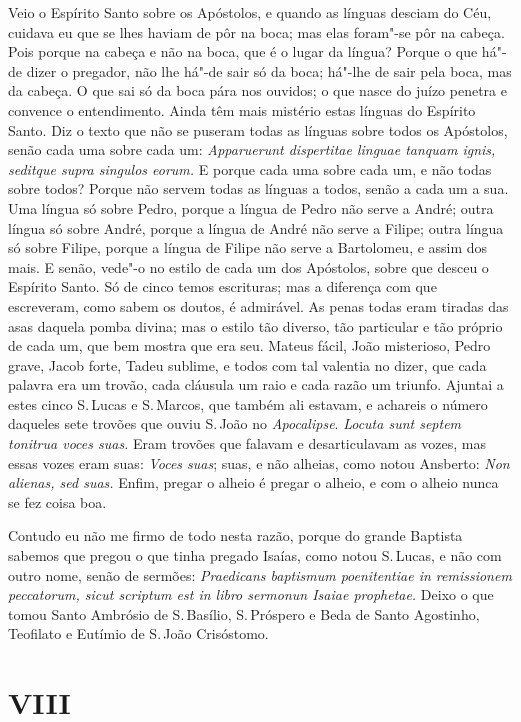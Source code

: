 Veio o Espírito Santo sobre os Apóstolos, e quando as línguas desciam do
Céu, cuidava eu que se lhes haviam de pôr na boca; mas elas foram"-se pôr
na cabeça. Pois porque na cabeça e não na boca, que é o lugar da língua?
Porque o que há"-de dizer o pregador, não lhe há"-de sair só da boca;
há"-lhe de sair pela boca, mas da cabeça. O que sai só da boca pára nos
ouvidos; o que nasce do juízo penetra e convence o entendimento. Ainda
têm mais mistério estas línguas do Espírito Santo. Diz o texto que não
se puseram
todas as línguas sobre todos os Apóstolos, senão cada uma sobre cada um:
\emph{Apparuerunt dispertitae linguae tanquam ignis, seditque supra
singulos eorum.} E porque cada uma sobre cada um, e
não todas sobre todos? Porque não servem todas as línguas a todos,
senão a cada um a sua. Uma língua só sobre Pedro, porque a língua de
Pedro não serve a André; outra língua só sobre André, porque a língua de
André não serve a Filipe; outra língua só sobre Filipe, porque a língua
de Filipe não serve a Bartolomeu, e assim dos mais. E senão, vede"-o no
estilo de cada um dos Apóstolos, sobre que desceu o Espírito Santo. Só
de cinco temos escrituras; mas a diferença com que escreveram, como
sabem os doutos, é admirável. As penas todas eram tiradas das asas
daquela pomba divina; mas o estilo tão diverso, tão particular e tão
próprio de cada um, que bem mostra que era seu. Mateus fácil, João
misterioso, Pedro grave, Jacob forte, Tadeu sublime, e todos com tal
valentia no dizer, que cada palavra era um trovão, cada cláusula um raio
e cada razão um triunfo. Ajuntai a estes cinco S.\,Lucas e S.\,Marcos, que
também ali estavam, e achareis o número daqueles sete trovões que
ouviu S.\,João no \emph{Apocalipse}. \emph{Locuta sunt septem tonitrua
voces suas.} Eram trovões que falavam e desarticulavam as vozes, mas
essas vozes eram suas: \emph{Voces suas}; suas, e não alheias, como
notou Ansberto: \emph{Non alienas, sed suas.} Enfim, pregar o alheio é
pregar o alheio, e com o alheio nunca se fez coisa boa.

Contudo eu não me firmo de todo nesta razão, porque do grande
Baptista sabemos que pregou o que tinha pregado Isaías, como notou S.\,Lucas, e não com outro nome, senão de sermões: \emph{Praedicans
baptismum poenitentiae in remissionem peccatorum, sicut scriptum est in
libro sermonun Isaiae prophetae.} Deixo o que tomou Santo Ambrósio de
S.\,Basílio, S.\,Próspero e Beda de Santo Agostinho, Teofilato e Eutímio
de S.\,João Crisóstomo.

\section{VIII}

